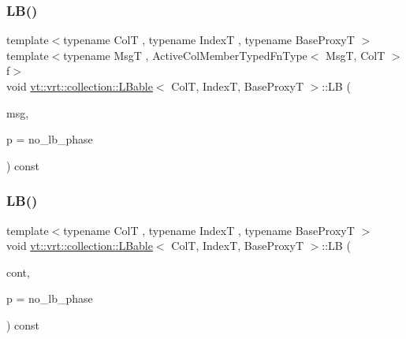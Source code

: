 \mbox{\label{structvt_1_1vrt_1_1collection_1_1_l_bable_a2a7f68f0b6a004bc7cb414ef0d94bbc5}} 
\subsubsection{\texorpdfstring{L\+B()}{LB()}\hspace{0.1cm}{\footnotesize\ttfamily [3/4]}}
{\footnotesize\ttfamily template$<$typename ColT , typename IndexT , typename Base\+ProxyT $>$ \\
template$<$typename MsgT , Active\+Col\+Member\+Typed\+Fn\+Type$<$ Msg\+T, Col\+T $>$ f$>$ \\
void \hyperlink{structvt_1_1vrt_1_1collection_1_1_l_bable}{vt\+::vrt\+::collection\+::\+L\+Bable}$<$ ColT, IndexT, Base\+ProxyT $>$\+::LB (\begin{DoxyParamCaption}\item[{\hyperlink{namespacevt_ab2b3d506ec8e8d1540aede826d84a239}{Msg\+Shared\+Ptr}$<$ MsgT $>$}]{msg,  }\item[{\hyperlink{namespacevt_a46ce6733d5cdbd735d561b7b4029f6d7}{Phase\+Type}}]{p = {\ttfamily no\+\_\+lb\+\_\+phase} }\end{DoxyParamCaption}) const}

\mbox{\label{structvt_1_1vrt_1_1collection_1_1_l_bable_ad62a2e83466342f7efe23c7b97c56caa}} 
\subsubsection{\texorpdfstring{L\+B()}{LB()}\hspace{0.1cm}{\footnotesize\ttfamily [4/4]}}
{\footnotesize\ttfamily template$<$typename ColT , typename IndexT , typename Base\+ProxyT $>$ \\
void \hyperlink{structvt_1_1vrt_1_1collection_1_1_l_bable}{vt\+::vrt\+::collection\+::\+L\+Bable}$<$ ColT, IndexT, Base\+ProxyT $>$\+::LB (\begin{DoxyParamCaption}\item[{\hyperlink{structvt_1_1vrt_1_1collection_1_1_l_bable_a27cc10ccbf93ad3d794998c79f710a5a}{Finished\+L\+B\+Type}}]{cont,  }\item[{\hyperlink{namespacevt_a46ce6733d5cdbd735d561b7b4029f6d7}{Phase\+Type}}]{p = {\ttfamily no\+\_\+lb\+\_\+phase} }\end{DoxyParamCaption}) const}

